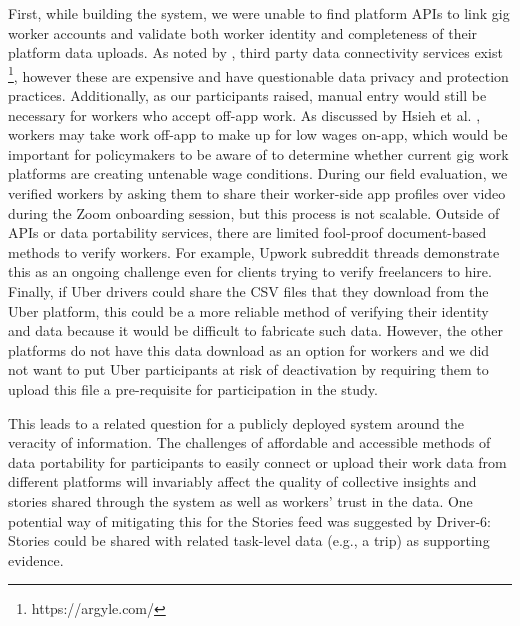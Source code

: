 First, while building the system, we were unable to find platform APIs to link gig worker accounts and validate both worker identity and completeness of their platform data uploads. As noted by \citet{dubal2023algorithmic}, third party data connectivity services exist \footnote{https://argyle.com/}, however these are expensive and have questionable data privacy and protection practices. Additionally, as our participants raised, manual entry would still be necessary for workers who accept off-app work. As discussed by Hsieh et al. \cite{supporting}, workers may take work off-app to make up for low wages on-app, which would be important for policymakers to be aware of to determine whether current gig work platforms are creating untenable wage conditions. %
During our field evaluation, we verified workers by asking them to share their worker-side app profiles over video during the Zoom onboarding session, but this process is not scalable. Outside of APIs or data portability services, there are limited fool-proof document-based methods to verify workers. For example, Upwork subreddit threads demonstrate this as an ongoing challenge even for clients trying to verify freelancers to hire. Finally, if Uber drivers could share the CSV files that they download from the Uber platform, this could be a more reliable method of verifying their identity and data because it would be difficult to fabricate such data. However, the other platforms do not have this data download as an option for workers and we did not want to put Uber participants at risk of deactivation by requiring them to upload this file a pre-requisite for participation in the study. %

This leads to a related question for a publicly deployed system around the veracity of information. The challenges of affordable and accessible methods of data portability for participants to easily connect or upload their work data from different platforms will invariably affect the quality of collective insights and stories shared through the system as well as workers' trust in the data.
One potential way of mitigating this for the Stories feed was suggested by Driver-6: Stories could be shared with related task-level data (e.g., a trip) as supporting evidence. %

